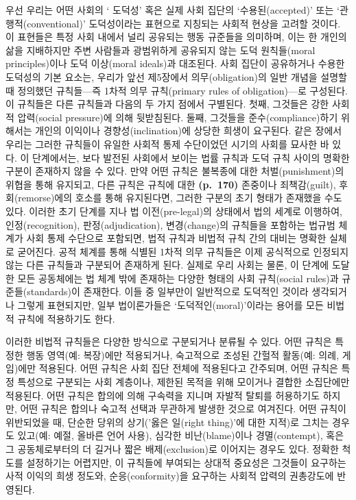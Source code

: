 우선 우리는 어떤 사회의 ` 도덕성' 혹은 실제 사회 집단의
`수용된(accepted)' 또는 `관행적(conventional)' 도덕성이라는 표현으로
지칭되는 사회적 현상을 고려할 것이다. 이 표현들은 특정 사회 내에서 널리
공유되는 행동 규준들을 의미하며, 이는 한 개인의 삶을 지배하지만 주변
사람들과 광범위하게 공유되지 않는 도덕 원칙들(moral principles)이나 도덕
이상(moral ideals)과 대조된다. 사회 집단이 공유하거나 수용한 도덕성의
기본 요소는, 우리가 앞선 제5장에서 의무(obligation)의 일반 개념을 설명할
때 정의했던 규칙들---즉 1차적 의무 규칙(primary rules of
obligation)---로 구성된다. 이 규칙들은 다른 규칙들과 다음의 두 가지
점에서 구별된다. 첫째, 그것들은 강한 사회적 압력(social pressure)에 의해
뒷받침된다. 둘째, 그것들을 준수(compliance)하기 위해서는 개인의 이익이나
경향성(inclination)에 상당한 희생이 요구된다. 같은 장에서 우리는 그러한
규칙들이 유일한 사회적 통제 수단이었던 시기의 사회를 묘사한 바 있다. 이
단계에서는, 보다 발전된 사회에서 보이는 법률 규칙과 도덕 규칙 사이의
명확한 구분이 존재하지 않을 수 있다. 만약 어떤 규칙은 불복종에 대한
처벌(punishment)의 위협을 통해 유지되고, 다른 규칙은 규칙에 대한
\textbf{(p.~170)} 존중이나 죄책감(guilt), 후회(remorse)에의 호소를 통해
유지된다면, 그러한 구분의 초기 형태가 존재했을 수도 있다. 이러한 초기
단계를 지나 법 이전(pre-legal)의 상태에서 법의 세계로 이행하여,
인정(recognition), 판정(adjudication), 변경(change)의 규칙들을 포함하는
법규범 체계가 사회 통제 수단으로 포함되면, 법적 규칙과 비법적 규칙 간의
대비는 명확한 실체로 굳어진다. 공적 체계를 통해 식별된 1차적 의무
규칙들은 이제 공식적으로 인정되지 않는 다른 규칙들과 구분되어 존재하게
된다. 실제로 우리 사회는 물론, 이 단계에 도달한 모든 공동체에는 법 체계
밖에 존재하는 다양한 형태의 사회 규칙(social rules)과
규준들(standards)이 존재한다. 이들 중 일부만이 일반적으로 도덕적인
것이라 생각되거나 그렇게 표현되지만, 일부 법이론가들은
`도덕적인(moral)'이라는 용어를 모든 비법적 규칙에 적용하기도 한다.

이러한 비법적 규칙들은 다양한 방식으로 구분되거나 분류될 수 있다. 어떤
규칙은 특정한 행동 영역(예: 복장)에만 적용되거나, 숙고적으로 조성된
간헐적 활동(예: 의례, 게임)에만 적용된다. 어떤 규칙은 사회 집단 전체에
적용된다고 간주되며, 어떤 규칙은 특정 특성으로 구분되는 사회 계층이나,
제한된 목적을 위해 모이거나 결합한 소집단에만 적용된다. 어떤 규칙은
합의에 의해 구속력을 지니며 자발적 탈퇴를 허용하기도 하지만, 어떤 규칙은
합의나 숙고적 선택과 무관하게 발생한 것으로 여겨진다. 어떤 규칙이
위반되었을 때, 단순한 당위의 상기('옳은 일(right thing)'에 대한 지적)로
그치는 경우도 있고(예: 예절, 올바른 언어 사용), 심각한 비난(blame)이나
경멸(contempt), 혹은 그 공동체로부터의 더 길거나 짧은 배제(exclusion)로
이어지는 경우도 있다. 정확한 척도를 설정하기는 어렵지만, 이 규칙들에
부여되는 상대적 중요성은 그것들이 요구하는 사적 이익의 희생 정도와,
순응(conformity)을 요구하는 사회적 압력의 권총강도에 반영된다.

